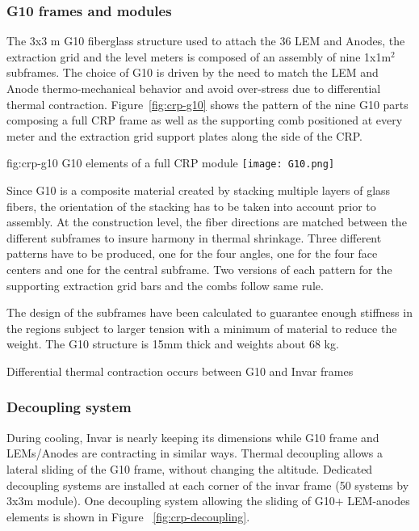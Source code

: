 \subsubsection{G10 frames and modules}

The 3x3 m G10 fiberglass structure used to attach the 36 LEM and Anodes, the extraction grid and the level meters is composed of an assembly of nine 1x1m$^2$ subframes. The choice of G10 is driven by the need to match the LEM and Anode thermo-mechanical behavior and avoid over-stress due to differential thermal contraction. 
Figure~\ref{fig:crp-g10} shows the pattern of the nine G10 parts composing a full CRP frame as well as the supporting comb positioned at every meter and the extraction grid support plates along the side of the CRP.

\begin{dunefigure}{fig:crp-g10}
{G10 elements of a full CRP module}
\texttt{[image: G10.png]}
\end{dunefigure}

Since G10 is a composite material created by stacking multiple layers of glass fibers,  the orientation of the stacking has to be taken into account prior to assembly.
At the construction level, the fiber directions are matched between the different subframes to insure harmony in thermal shrinkage. Three different patterns have to be produced, one for the four angles, one for the four face centers and one for the central subframe.
Two versions of each pattern for the supporting extraction grid bars and the combs follow same rule.

The design of the subframes have been calculated to guarantee enough stiffness in the  regions subject to larger tension with a minimum of material to reduce the weight.
The G10 structure is 15mm thick and weights about 68 kg. 

Differential thermal contraction occurs between G10 and Invar frames

\subsubsection{Decoupling system}
During cooling, Invar is nearly keeping its dimensions while G10 frame and LEMs/Anodes are contracting in similar ways. Thermal decoupling allows a lateral sliding of the G10 frame, without changing the altitude.
Dedicated decoupling systems are installed at each corner of the invar frame (50 systems by 3x3m module). One decoupling system allowing the sliding of G10+ LEM-anodes elements is shown in  Figure ~\ref{fig:crp-decoupling}.

